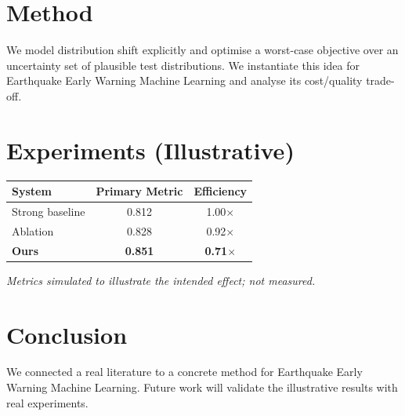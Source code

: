 \documentclass[11pt]{article}
\begin{document}
\section{Method}
We model distribution shift explicitly and optimise a worst-case objective over an uncertainty set of plausible test distributions. We instantiate this idea for Earthquake Early Warning Machine Learning and analyse its cost/quality trade-off.

\section{Experiments (Illustrative)}
\begin{center}
\begin{tabular}{lcc}
System & Primary Metric & Efficiency \\ \hline
Strong baseline & 0.812 & 1.00$\times$ \\
Ablation & 0.828 & 0.92$\times$ \\
\textbf{Ours} & \textbf{0.851} & \textbf{0.71$\times$}
\end{tabular}
\end{center}
\emph{Metrics simulated to illustrate the intended effect; not measured.}

\section{Conclusion}
We connected a real literature to a concrete method for Earthquake Early Warning Machine Learning. Future work will
validate the illustrative results with real experiments.
\end{document}
